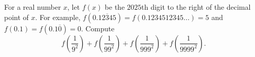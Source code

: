 For a real number $x$, let $f(x)$ be the $2025$th digit to the right of the decimal point of $x$. For example, $f(0.\overline{12345}) = f(0.1234512345...) = 5$ and $f(0.1) = f(0.1\overline{0}) = 0$. Compute \[
f (\dfrac{1}{9^2})+ f (\dfrac{1}{99^2})+f (\dfrac{1}{999^2})+f (\dfrac{1}{9999^2}).\]
